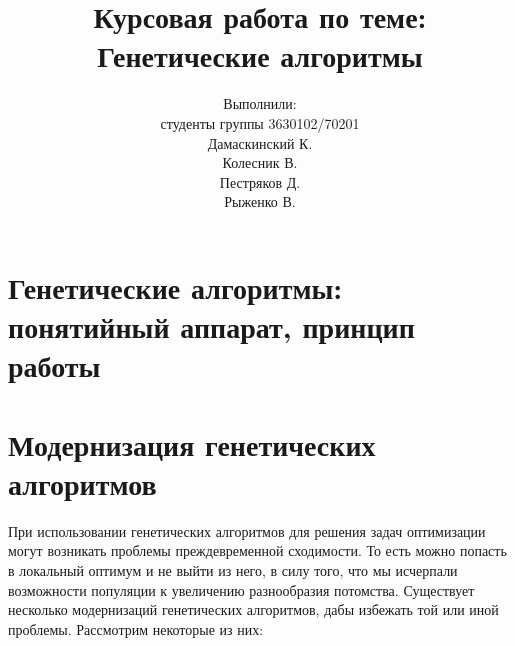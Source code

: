 


\thispagestyle{empty}


\title{Курсовая работа по теме: \\ Генетические алгоритмы}
\author{Выполнили:\\студенты группы 3630102/70201\\Дамаскинский К.\\Колесник В.\\Пестряков Д.\\Рыженко В.}
\maketitle

\pagestyle{fancy}
\fancyhf{}
\fancyfoot[C]{\thepage}
\renewcommand{\headrulewidth}{0pt}
\renewcommand{\footrulewidth}{0pt}
\tableofcontents
\pagebreak

\chapter{Генетические алгоритмы: понятийный аппарат, принцип работы}
\chapter{Модернизация генетических алгоритмов}
При использовании генетических алгоритмов для решения задач оптимизации могут возникать проблемы преждевременной сходимости. То есть можно попасть в локальный оптимум и не выйти из него, в силу того, что мы исчерпали возможности популяции к увеличению разнообразия потомства. Существует несколько модернизаций генетических алгоритмов, дабы избежать той или иной проблемы. Рассмотрим некоторые из них:

